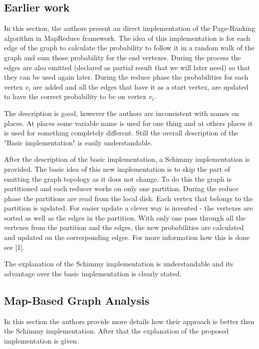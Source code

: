 \documentclass[12pt]{article}
\theoremstyle{plain}
\begin{document}
\subsection{Earlier work} %
\label{sub:Earlier work}
  In this section, the authors present an direct implementation of the
  Page-Ranking algorithm in MapReduce framework. The idea of this implementation
  is for each edge of the graph to calculate the probability to follow it in
  a random walk of the graph and sum those probability for the end vertexes. 
  During the process the edges are also emitted (declared as partial result that
  we will later need) so that they can be used again later. During the reduce
  phase the probabilities for each vertex $v_i$ are added and all the edges that
  have it as a start vertex, are updated to have the correct probability to be
  on vertex $v_i$.
  
  The description is good, however the authors are inconsistent with names on
  places. At places some variable name is used for one thing and at others
  places it is used for something completely different. Still the overall
  description of the "Basic implementation" is easily understandable.  

  After the description of the basic implementation, a Schimmy implementation is
  provided. The basic idea of this new implementation is to skip the part of 
  emitting the graph topology as it does not change. To do this the graph is 
  partitioned and each reducer works on only one partition. During the reduce
  phase the partitions are read from the local disk. Each vertex that belongs
  to the partition is updated. For easier update a clever way is invented - 
  the vertexes are sorted as well as the edges in the partition. With only one
  pass through all the vertexes from the partition and the edges, the new 
  probabilities are calculated and updated on the corresponding edges. For more
  information how this is done see [1].

  The explanation of the Schimmy implementation is understandable and its 
  advantage over the basic implementation is clearly stated. 

\subsection{Map-Based Graph Analysis} %
\label{sub:Map-Based Graph Analysis}
  In this section the authors provide more details how their approach is better
  then the Schimmy implementation. After that the explanation of the proposed
  implementation is given.
\end{document}
